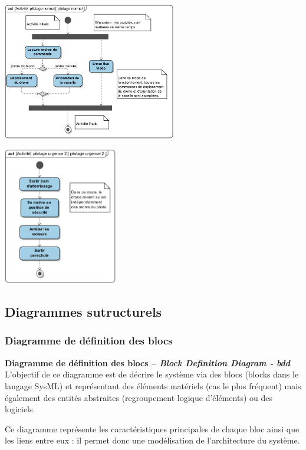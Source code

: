 \documentclass[11pt,oneside]{article}
\begin{document}
\begin{exemple}

\begin{minipage}[c]{.55\linewidth}
\begin{center}
\includegraphics[height=6cm]{png/PNG/SysML_Drone_Act_Normal}
\end{center}
\end{minipage} \hfill
\begin{minipage}[c]{.4\linewidth}
\begin{center}
\includegraphics[height=6cm]{png/PNG/SysML_Drone_Act_Urgence2}
\end{center}
\end{minipage}
\end{exemple}





\subsection{Diagrammes sutructurels}
\subsubsection{Diagramme de définition des blocs}
\begin{defi}
\textbf{Diagramme de définition des blocs -- \textit{Block Definition Diagram - bdd}}
L’objectif de ce diagramme est de décrire le système via des blocs (blocks dans le langage
SysML) et représentant des éléments matériels (cas le plus fréquent) mais également des
entités abstraites (regroupement logique d’éléments) ou des logiciels.

Ce diagramme représente les caractéristiques principales de chaque bloc ainsi que les liens
entre eux : il permet donc une modélisation de l’architecture du système.

\end{defi}
\end{document}
